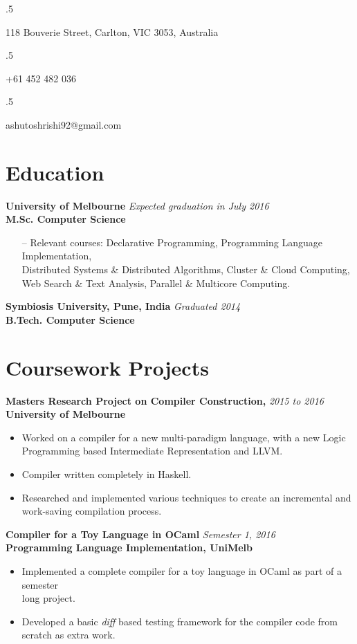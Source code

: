 \documentclass[a4paper,overlapped]{res}
\begin{document}


\begin{resume}
  \moveleft.5\hoffset\centerline{118 Bouverie Street, Carlton, VIC 3053, Australia}
  \moveleft.5\hoffset\centerline{+61 452 482 036}
  \moveleft.5\hoffset\centerline{ashutoshrishi92@gmail.com}

  \section{Education}  
  \textbf{University of Melbourne} \hfill \textit{Expected graduation in July 2016} \\
  \textbf{M.Sc. Computer Science }
  \begin{itemize} \itemsep -2pt
  \item[--] Relevant courses: Declarative Programming, Programming Language
    Implementation, \\ Distributed Systems \& Distributed Algorithms, Cluster
    \& Cloud Computing,\\ Web Search \& Text Analysis, Parallel \& Multicore
    Computing.
  \end{itemize}

  \textbf{Symbiosis University, Pune, India} \hfill \textit{Graduated 2014} \\
  \textbf{B.Tech. Computer Science }


  \section{Coursework Projects}
  
  \textbf{Masters Research Project on Compiler Construction,} \hfill
  \textit{2015 to 2016}\\
  \textbf{University of Melbourne}
  \begin{itemize}
  \item Worked on a compiler for a new multi-paradigm language, with a new
    Logic \\ Programming based Intermediate Representation and LLVM.
  \item Compiler written completely in Haskell.
  \item Researched and implemented various techniques to create an incremental
    and \\work-saving compilation process.
  \end{itemize}

  \textbf{Compiler for a Toy Language in OCaml} \hfill \textit{Semester 1,
    2016}\\
  \textbf{Programming Language Implementation, UniMelb}
  \begin{itemize}
  \item Implemented a complete compiler for a toy language in OCaml as part of
    a semester\\ long project.
  \item Developed a basic \textit{diff} based testing framework for the
    compiler code from\\ scratch as extra work.
  \end{itemize}
  


\end{resume}
\end{document}
